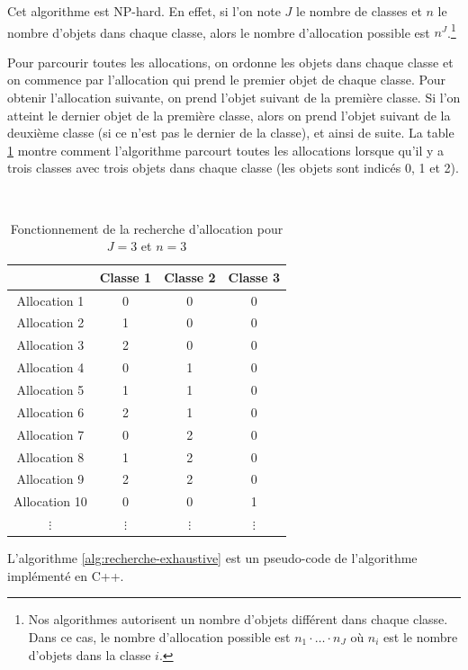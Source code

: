 \documentclass{article}
\begin{document}
Cet algorithme est NP-hard.
En effet, si l'on note $J$ le nombre de classes et $n$ le nombre d'objets dans chaque classe, alors le nombre d'allocation possible est $n^J$.\footnote{Nos algorithmes autorisent un nombre d'objets différent dans chaque classe. Dans ce cas, le nombre d'allocation possible est $n_1 \cdot \dots \cdot n_J$ où $n_i$ est le nombre d'objets dans la classe $i$.}

Pour parcourir toutes les allocations, on ordonne les objets dans chaque classe et on commence par l'allocation qui prend le premier objet de chaque classe.
Pour obtenir l'allocation suivante, on prend l'objet suivant de la première classe.
Si l'on atteint le dernier objet de la première classe, alors on prend l'objet suivant de la deuxième classe (si ce n'est pas le dernier de la classe), et ainsi de suite.
La table \ref{tab:recherche-exhaustive} montre comment l'algorithme parcourt toutes les allocations lorsque qu'il y a trois classes avec trois objets dans chaque classe (les objets sont indicés 0, 1 et 2).

\begin{table}[!ht]
	\centering
	\caption{Fonctionnement de la recherche d'allocation pour $J=3$ et $n=3$}
	\label{tab:recherche-exhaustive}
	~\\
	\begin{tabular}{c|ccc}
		& Classe 1 & Classe 2 & Classe 3\\
		\hline
		Allocation 1 & 0 & 0 & 0\\
		Allocation 2 & 1 & 0 & 0\\
		Allocation 3 & 2 & 0 & 0\\
		Allocation 4 & 0 & 1 & 0\\
		Allocation 5 & 1 & 1 & 0\\
		Allocation 6 & 2 & 1 & 0\\
		Allocation 7 & 0 & 2 & 0\\
		Allocation 8 & 1 & 2 & 0\\
		Allocation 9 & 2 & 2 & 0\\
		Allocation 10 & 0 & 0 & 1\\
		$\vdots$ & $\vdots$ & $\vdots$ & $\vdots$\\
	\end{tabular}
\end{table}

L'algorithme \ref{alg:recherche-exhaustive} est un pseudo-code de l'algorithme implémenté en C++.
\end{document}
